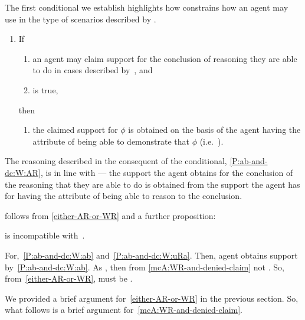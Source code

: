 \begin{note}[Conditional A]
  The first conditional we establish highlights how \uRa{} constrains how an agent may use \gsi{} in the type of scenarios described by \eA{}.

  \begin{proposition}[\mcA{}]
  \begin{enumerate}[label=(C\Alph*), ref=(C\Alph*)]
  \item\label{P:ab-and-dc:W} If
    \begin{enumerate}[label=(\roman*), ref=(CA.\roman*)]
    \item\label{P:ab-and-dc:W:ab} an agent may claim support for the conclusion of reasoning they are able to do in cases described by~\eA{}, and
    \item\label{P:ab-and-dc:W:uRa} \uRa{} is true,
    \end{enumerate}
    then
    \begin{enumerate}[label=(\roman*), ref=(CA.\roman*), resume]
    \item\label{P:ab-and-dc:W:AR} the claimed support for \(\phi\) is obtained on the basis of the agent having the attribute of being able to demonstrate that \(\phi\) (i.e.\ \AR{}).
    \end{enumerate}
  \end{enumerate}
\end{proposition}

  The reasoning described in the consequent of the conditional, \ref{P:ab-and-dc:W:AR}, is in line with \AR{} --- the support the agent obtains for the conclusion of the reasoning that they are able to do is obtained from the support the agent has for having the attribute of being able to reason to the conclusion.
\end{note}

\begin{note}
  \mcA{} follows from \ref{either-AR-or-WR} and a further proposition:
  \begin{proposition}\label{mcA:WR-and-denied-claim}
    \WR{} is incompatible with~\uRa{}.
  \end{proposition}

  For,~\ref{P:ab-and-dc:W:ab} and~\ref{P:ab-and-dc:W:uRa}.
  Then, agent obtains support by~\ref{P:ab-and-dc:W:ab}.
  As \uRa{}, then from \ref{mcA:WR-and-denied-claim} not \WR{}.
  So, from~\ref{either-AR-or-WR}, must be \AR{}.
\end{note}

\begin{note}[To argument]
  {
    \color{red}
    We provided a brief argument for~\ref{either-AR-or-WR} in the previous section.
  }
  So, what follows is a brief argument for~\ref{mcA:WR-and-denied-claim}.
\end{note}

